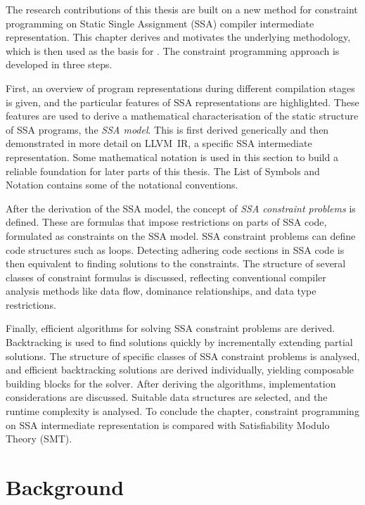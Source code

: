 
    The research contributions of this thesis are built on a new method for
    constraint programming on Static Single Assignment (SSA) compiler
    intermediate representation.
    This chapter derives and motivates the underlying methodology, which is
    then used as the basis for
    .
    The constraint programming approach is developed in three steps.

    First, an overview of program representations during different compilation
    stages is given, and the particular features of SSA representations are
    highlighted.
    These features are used to derive a mathematical characterisation of
    the static structure of SSA programs, the {\it SSA model}.
    This is first derived generically and then demonstrated
    in more detail on \mbox{LLVM IR}, a specific SSA intermediate
    representation.
    Some mathematical notation is used in this section to build a reliable
    foundation for later parts of this thesis.
    The List of Symbols and Notation contains some of the notational
    conventions.

    After the derivation of the SSA model, the concept of
    {\it SSA constraint problems} is defined.
    These are formulas that impose restrictions on parts of SSA code,
    formulated as constraints on the SSA model.
    SSA constraint problems can define code structures such as loops.
    Detecting adhering code sections in SSA code is then equivalent to finding
    solutions to the constraints.
    The structure of several classes of constraint formulas is discussed,
    reflecting conventional compiler analysis methods like data flow,
    dominance relationships, and data type restrictions.

    Finally, efficient algorithms for solving SSA constraint problems are
    derived.
    Backtracking is used to find solutions quickly by incrementally extending
    partial solutions.
    The structure of specific classes of SSA constraint problems is analysed,
    and efficient backtracking solutions are derived individually, yielding
    composable building blocks for the solver.
    After deriving the algorithms, implementation considerations are
    discussed.
    Suitable data structures are selected, and the runtime complexity is
    analysed.
    To conclude the chapter, constraint programming on SSA intermediate
    representation is compared with Satisfiability Modulo Theory (SMT).

\section{Background}

